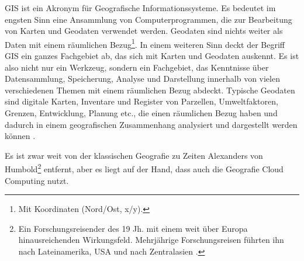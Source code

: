 GIS ist ein Akronym für Geografische Informationssysteme. Es bedeutet im engsten Sinn eine Ansammlung von Computerprogrammen, die zur Bearbeitung von Karten und Geodaten verwendet werden. Geodaten sind nichts weiter als Daten mit einem räumlichen Bezug\footnote{Mit Koordinaten (Nord/Ost, x/y).}. In einem weiteren Sinn deckt der Begriff GIS ein ganzes Fachgebiet ab, das sich mit Karten und Geodaten auskennt. Es ist also nicht nur ein Werkzeug, sondern ein Fachgebiet, das Kenntnisse über Datensammlung, Speicherung, Analyse und Darstellung innerhalb von vielen verschiedenen Themen mit einem räumlichen Bezug abdeckt. Typische Geodaten sind digitale Karten, Inventare und Register von Parzellen, Umweltfaktoren, Grenzen, Entwicklung, Planung etc., die einen räumlichen Bezug haben und dadurch in einem geografischen Zusammenhang analysiert und dargestellt werden können \autocite[15]{Balstroem}.

Es ist zwar weit von der klassischen Geografie zu Zeiten Alexanders von Humbold\footnote{Ein Forschungsreisender des 19 Jh. mit einem weit über Europa hinausreichenden Wirkungsfeld. Mehrjährige Forschungsreisen führten ihn nach Lateinamerika, USA und nach Zentralasien \cite{Kehlmann2005}.} entfernt, aber es liegt auf der Hand, dass auch die Geografie Cloud Computing nutzt.